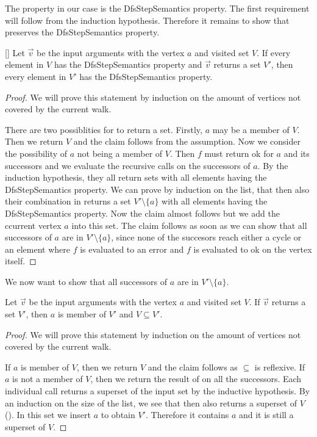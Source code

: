 The property in our case is the DfsStepSemantics property. The first requirement will follow from the induction hypothesis. Therefore it remains to show that \dfsstep preserves the DfsStepSemantics property. 

\begin{lemma}\label{lem:dfsStepProp}[\dfssteppreservesnotReachesCycleAndCounterExample]
  Let $\vec{v}$ be the input arguments with the vertex $a$ and visited set $V$. If every element in $V$ has the DfsStepSemantics property and \dfsstep $\vec{v}$ returns a set $V'$, then every element in $V'$ has the DfsStepSemantics property.
\end{lemma}
\begin{proof}
  We will prove this statement by induction on the amount of vertices not covered by the current walk.

  There are two possiblities for \dfsstep to return a set. Firstly, $a$ may be a member of $V$. Then we return $V$ and the claim follows from the assumption.
  Now we consider the possibility of $a$ not being a member of $V$. Then $f$ must return ok for $a$ and its successors and we evaluate the recursive calls on the successors of $a$. By the induction hypothesis, they all return sets with all elements having the DfsStepSemantics property. We can prove by induction on the list, that then also their combination in \foldlexceptset returns a set $V' \setminus \{a\}$ with all elements having the DfsStepSemantics property. Now the claim almost follows but we add the ccurrent vertex $a$ into this set. The claim follows as soon as we can show that all successors of $a$ are in $V' \setminus \{a\}$, since none of the succesors reach either a cycle or an element where $f$ is evaluated to an error and $f$ is evaluated to ok on the vertex itself.
\end{proof}

We now want to show that all successors of $a$ are in $V' \setminus \{a\}$. 

\begin{lemma}[\dfsstepreturnsrootelement, \dfsstepsubset]
  Let $\vec{v}$ be the input arguments with the vertex $a$ and visited set $V$. If \dfsstep $\vec{v}$ returns a set $V'$, then $a$ is member of $V'$ and $V \subseteq V'$.
\end{lemma}
\begin{proof}
  We will prove this statement by induction on the amount of vertices not covered by the current walk.

  If $a$ is member of $V$, then we return $V$ and the claim follows as $\subseteq$ is reflexive.
  If $a$ is not a member of $V$, then we return the result of \foldlexceptset on all the successors. Each individual call returns a superset of the input set by the inductive hypothesis. By an induction on the size of the list, we see that then also \foldlexceptset returns a superset of $V$ (\foldlexceptsetsubset). In this set we insert $a$ to obtain $V'$. Therefore it contains $a$ and it is still a superset of $V$.
\end{proof}

